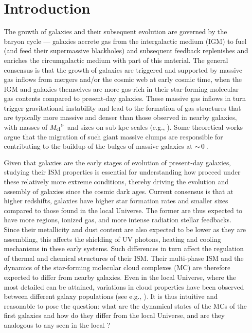 \IfFileExists{emulateapjlegacy.cls}{\documentclass[iop]{emulateapjlegacy}}{\documentclass[iop]{emulateapj}}
\begin{document}
\section{Introduction}\label{sec:intro}

The growth of galaxies and their subsequent evolution are governed by the baryon cycle ---
galaxies accrete gas from the intergalactic medium (IGM) to fuel \SF (and feed their supermassive blackholes)
and subsequent feedback replenishes and enriches the circumgalactic medium with part of this material.
The general consensus is that the growth of \highz galaxies are triggered and supported by massive
gas inflows from mergers and/or the cosmic web at early cosmic time, when the IGM and galaxies themselves
are more gas-rich in their star-forming molecular
gas contents compared to present-day galaxies.
These massive gas inflows in turn trigger gravitational instability and lead
to the formation of gas structures that are typically more massive and denser than those
observed in nearby galaxies, with masses of $M_{\rm cl}$$^9$\,\Msun
and sizes on sub-kpc scales (e.g., \citealt{Gabor13a, Hopkins14a, Inoue16a}).
Some theoretical works argue that the
migration of such giant massive clumps are responsible for contributing to the
buildup of the bulges of massive galaxies at \z$\sim$\,0 \citep[e.g.,][]{Ceverino10a}.

Given that \highz galaxies are the early stages of evolution of present-day galaxies, studying their ISM properties is essential for understanding how \SF proceed under these relatively more extreme conditions, thereby driving the evolution and assembly
of galaxies
since the cosmic dark ages.
Current consensus is that at higher redshifts, galaxies have higher
star formation rates \citep[SFR; ][]{Behroozi13b, Sparre15a, Maiolino15a, Dunlop17a} and
smaller sizes \citep[e.g.,][]{Bouwens11a, Ono13a} compared to those found in the local Universe.
The former are thus expected to have more  regions, ionized gas, and more intense radiation stellar feedbacks.
Since their metallicity and dust content are also expected to be lower as they are assembling,
this affects the shielding of UV photons, heating and cooling mechanisms in these early systems. Such differences in turn
affect the regulation of thermal and chemical structures of their ISM.
Their multi-phase ISM and the dynamics of the star-forming molecular cloud complexes (MC)
are therefore expected to differ from nearby galaxies.
Even in the local Universe, where the most detailed \obs can be attained, variations in cloud properties have been
observed between different galaxy populations (see e.g., \citealt{Hughes10a, Hughes13b}).
It is thus intuitive and reasonable to pose the question: what are the dynamical states of the MCs of the first galaxies and
how do they differ from the local Universe, and are they analogous to any seen in the local \galpop?
%
\end{document}
